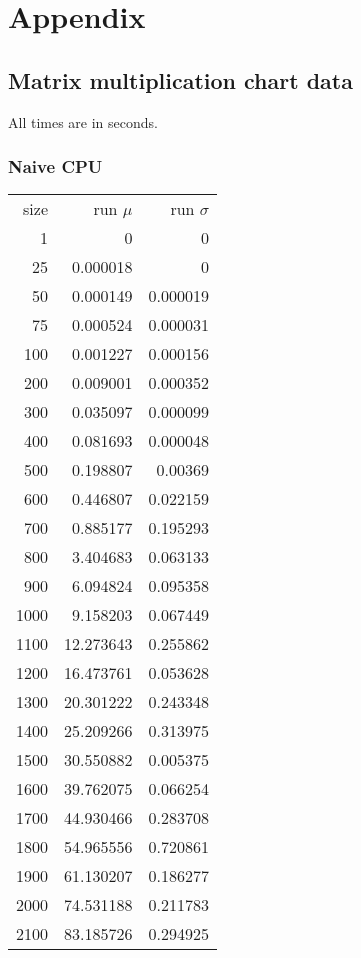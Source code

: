 \section{Appendix}

\subsection{Matrix multiplication chart data}
\label{sec:matrix_mul_chart_data}

All times are in seconds.

\subsubsection{Naive CPU}

\begin{tabular}{r r r}
size & run $\mu$ & run $\sigma$ \\
1 & 0 & 0 \\
25 & 0.000018 & 0 \\
50 & 0.000149 & 0.000019 \\
75 & 0.000524 & 0.000031 \\
100 & 0.001227 & 0.000156 \\
200 & 0.009001 & 0.000352 \\
300 & 0.035097 & 0.000099 \\
400 & 0.081693 & 0.000048 \\
500 & 0.198807 & 0.00369 \\
600 & 0.446807 & 0.022159 \\
700 & 0.885177 & 0.195293 \\
800 & 3.404683 & 0.063133 \\
900 & 6.094824 & 0.095358 \\
1000 & 9.158203 & 0.067449 \\
1100 & 12.273643 & 0.255862 \\
1200 & 16.473761 & 0.053628 \\
1300 & 20.301222 & 0.243348 \\
1400 & 25.209266 & 0.313975 \\
1500 & 30.550882 & 0.005375 \\
1600 & 39.762075 & 0.066254 \\
1700 & 44.930466 & 0.283708 \\
1800 & 54.965556 & 0.720861 \\
1900 & 61.130207 & 0.186277 \\
2000 & 74.531188 & 0.211783 \\
2100 & 83.185726 & 0.294925 \\

\end{tabular}

